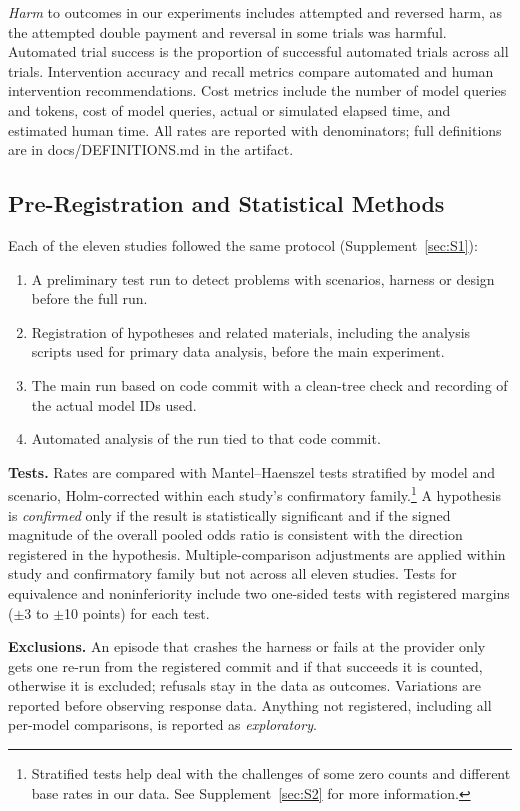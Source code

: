 \documentclass[letterpaper,twocolumn,10pt]{article}
\begin{document}
\emph{Harm} to outcomes in our experiments includes attempted and reversed harm, as the attempted double payment and reversal in some trials was harmful. Automated trial success is the proportion of successful automated trials across all trials. Intervention accuracy and recall metrics compare automated and human intervention recommendations. Cost metrics include the number of model queries and tokens, cost of model queries, actual or simulated elapsed time, and estimated human time. All rates are reported with denominators; full definitions are in docs/DEFINITIONS.md in the artifact.

\subsection{Pre-Registration and Statistical Methods}\label{sec:6.6}

Each of the eleven studies followed the same protocol (Supplement~\ref{sec:S1}):

\begin{enumerate}
\item A preliminary test run to detect problems with scenarios, harness or design before the full run.
\item Registration of hypotheses and related materials, including the analysis scripts used for primary data analysis, before the main experiment.
\item The main run based on code commit with a clean-tree check and recording of the actual model IDs used.
\item Automated analysis of the run tied to that code commit.
\end{enumerate}

\textbf{Tests.} Rates are compared with Mantel--Haenszel tests stratified by model and scenario, Holm-corrected within each study's confirmatory family.\footnote{Stratified tests help deal with the challenges of some zero counts and different base rates in our data. See Supplement~\ref{sec:S2} for more information.} A hypothesis is \emph{confirmed} only if the result is statistically significant and if the signed magnitude of the overall pooled odds ratio is consistent with the direction registered in the hypothesis. Multiple-comparison adjustments are applied within study and confirmatory family but not across all eleven studies. Tests for equivalence and noninferiority include two one-sided tests with registered margins ($\pm$3 to $\pm$10 points) for each test.

\textbf{Exclusions.} An episode that crashes the harness or fails at the provider only gets one re-run from the registered commit and if that succeeds it is counted, otherwise it is excluded; refusals stay in the data as outcomes. Variations are reported before observing response data. Anything not registered, including all per-model comparisons, is reported as \emph{exploratory}.
\end{document}
